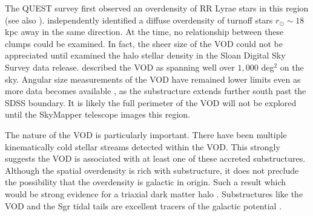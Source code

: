 \documentclass{emulateapj}
\begin{document}
The QUEST survey \citet{Vivas;et-al_2001} first observed an overdensity of RR Lyrae stars in this region (see also \citet{Zinn;etal_2004}). \citet{Newberg;et-al_2002} independently identified a diffuse overdensity of turnoff stars $r_\odot \sim18$ kpc away in the same direction. At the time, no relationship between these clumps could be examined. In fact, the sheer size of the VOD could not be appreciated until \citet{Juric;et-al_2008} examined the halo stellar density in the Sloan Digital Sky Survey \citep[hereafter SDSS]{York;et-al_2000} data release. \citet{Juric;et-al_2008} described the VOD as spanning well over $1,000$ deg$^{2}$ on the sky. Angular size measurements of the VOD have remained lower limits even as more data becomes available \citep{Duffau;et-al_2006, Juric;et-al_2008, Bonaco;et-al_2012}, as the substructure extends further south past the SDSS boundary. It is likely the full perimeter of the VOD will not be explored until the SkyMapper telescope \citep{Keller;et-al_2007} images this region.

The nature of the VOD is particularly important. There have been multiple kinematically cold stellar streams detected within the VOD. This strongly suggests the VOD is associated with at least one of these accreted substructures. Although the spatial overdensity is rich with substructure, it does not preclude the possibility that the overdensity is galactic in origin. Such a result which would be strong evidence for a triaxial dark matter halo \citep{Newberg;et-al_2007}. Substructures like the VOD and the Sgr tidal tails are excellent tracers of the galactic potential \citep{Law;et-al_2005, Casey;et-al_2012a}.







\end{document}

